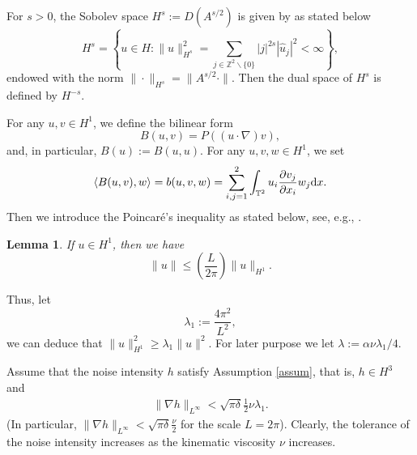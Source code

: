 \documentclass{elsarticle}
\newtheorem{lemma}[theorem]{Lemma}
\theoremstyle{definition}
\numberwithin{equation}{section}
\renewcommand{\d}{{\rm{d}}}
\begin{document}
   For $s >0 $,    the Sobolev space  $H^s:=D(A^{s/2})$  is given  by as stated below
 \[
H^s =\left \{u\in H:\|u\|^2_{H^s}=\sum\limits_{j\in \mathbb{Z}^{2}\backslash \{0\}}|j|^{2s}|\hat{u}_j|^2<\infty \right \},
 \]
endowed with the norm $\|\cdot\|_{H^s}=\|A^{s/2}\cdot \|$. Then the dual space of $H^s$ is defined by $H^{-s}$.


For any $u,v\in H^1$,  we define the bilinear form
\[
B(u,v)=P((u\cdot\nabla)v) ,
\]
and, in particular, $B(u):=B(u,u)$. For any  $u,v,w\in H^1$, we set
\begin{align*}
\langle B(u,v),w\rangle=b(u,v,w)=\sum\limits_{i,j=1}^2\int_{\mathbb{T}^2}u_i\frac{\partial v_j}{\partial x_i}w_j\d x.
\end{align*}
 Then we introduce the Poincar\'e's inequality as stated below, see, e.g., \cite[lemma 5.40]{robinson01}.

\begin{lemma}  If $u\in H^1$, then we have
\begin{equation} \label{poin}
 \|u\| \leq \left( \frac L{2\pi} \right) \|    u\|_{H^1}.
\end{equation}
\end{lemma}
Thus, let
\[
 \lambda_1 :=   \frac{4\pi^2 } {L^2}  ,
\]
we can deduce that $\| u\|_{H^1}^2 \geq\lambda_1 \|u\|^2$. For later purpose we  let $\lambda:= \alpha \nu \lambda_1/4$.

Assume that  the noise  intensity $h$  satisfy Assumption  \ref{assum}, that is,     $ h \in H^3$ and
\begin{align}\label{2.3}
  \|\nabla h\|_{L^\infty} <   \sqrt{\pi\delta}\frac{1}{2} \nu \lambda_1 .
\end{align}
 (In particular, $\|\nabla h\|_{L^\infty} < \sqrt{\pi\delta} \frac{\nu}{2} $  for the scale $L=2\pi$).
Clearly, the  tolerance of the noise  intensity     increases as the kinematic viscosity $\nu$ increases.
\end{document}
